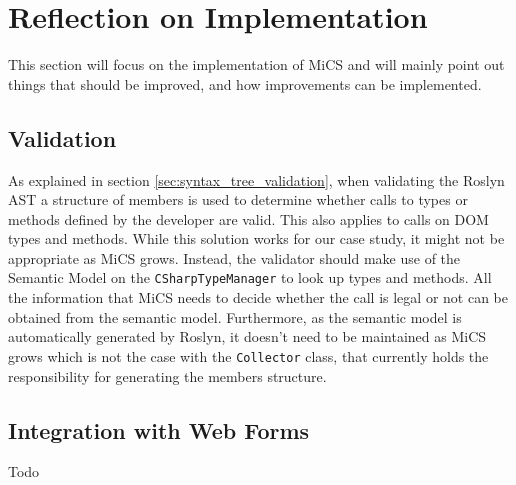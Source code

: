 \section{Reflection on Implementation} %
\label{sec:reflection_on_implementation}
This section will focus on the implementation of MiCS and will mainly point out things that should be improved, and how improvements can be implemented.


\subsection{Validation} %
\label{ssub:validation}

As explained in section \ref{sec:syntax_tree_validation}, when validating the Roslyn AST a structure of members is used to determine whether calls to types or methods defined by the developer are valid. This also applies to calls on DOM types and methods. While this solution works for our case study, it might not be appropriate as MiCS grows. Instead, the validator should make use of the Semantic Model on the \texttt{CSharpTypeManager} to look up types and methods. All the information that MiCS needs to decide whether the call is legal or not can be obtained from the semantic model. Furthermore, as the semantic model is automatically generated by Roslyn, it doesn't need to be maintained as MiCS grows which is not the case with the \texttt{Collector} class, that currently holds the responsibility for generating the members structure.

\subsection{Integration with Web Forms} %
\label{ssub:integration_with_web_forms}
Todo

